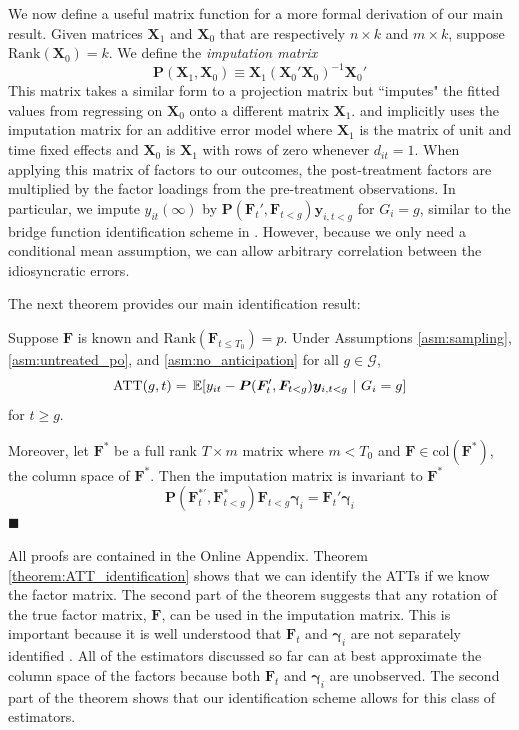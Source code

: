 We now define a useful matrix function for a more formal derivation of our main result. Given matrices $\bm X_1$ and $\bm X_0$ that are respectively $n \times k$ and $m \times k$, suppose $\text{Rank}( \bm X_0) = k$. We define the \textit{imputation matrix} 
\begin{equation}
  \bm P(\bm X_1, \bm X_0) \equiv \bm X_1 (\bm X_0' \bm X_0)^{-1} \bm X_0'
\end{equation}
This matrix takes a similar form to a projection matrix but ``imputes" the fitted values from regressing on $\bm X_0$ onto a different matrix $\bm X_1$. \citet{Gardner_2021} and \citet{Borusyak_Jaravel_Spiess_2021} implicitly uses the imputation matrix for an additive error model where $\bm X_1$ is the matrix of unit and time fixed effects and $\bm X_0$ is $\bm X_1$ with rows of zero whenever $d_{it} = 1$. When applying this matrix of factors to our outcomes, the post-treatment factors are multiplied by the factor loadings from the pre-treatment observations. In particular, we impute $y_{it}(\infty)$ by $\bm P(\bm{F}_{t}', \bm{F}_{t < g}) \bm y_{i,t < g}$ for $G_i = g$, similar to the bridge function identification scheme in \citet{Imbens_Kallus_Mao_2021}. However, because we only need a conditional mean assumption, we can allow arbitrary correlation between the idiosyncratic errors. 

The next theorem provides our main identification result:
\begin{theorem}\label{theorem:ATT_identification}
  Suppose $\bm{F}$ is known and $\text{Rank}(\bm{F}_{t \leq T_0}) = p$. Under Assumptions \ref{asm:sampling}, \ref{asm:untreated_po}, and \ref{asm:no_anticipation} for all $g \in \mathcal{G}$,
  \begin{equation}\label{eq:ATT_moments}
    \ATT(g,t) = \expec{y_{it} - \bm P(\bm{F}_{t}', \bm{F}_{t < g}) \bm y_{i,t < g}}{G_i = g}
  \end{equation}
  for $t \geq g$. 

  Moreover, let $\bm{F}^*$ be a full rank $T \times m$ matrix where $m < T_0$ and $\bm{F} \in \text{col}(\bm{F}^*)$, the column space of $\bm{F}^*$. Then the imputation matrix is invariant to $\bm{F}^*$
  \begin{equation}
    \bm P(\bm{F}_t^{*'}, \bm{F}^*_{t < g}) \bm{F}_{t < g} \bm \gamma_i = \bm{F}_t' \bm \gamma_i
  \end{equation}
  $\blacksquare$
\end{theorem}

All proofs are contained in the Online Appendix. Theorem \ref{theorem:ATT_identification} shows that we can identify the ATTs if we know the factor matrix. The second part of the theorem suggests that any rotation of the true factor matrix, $\bm{F}$, can be used in the imputation matrix. This is important because it is well understood that $\bm{F}_t$ and $\bm{\gamma}_i$ are not separately identified \citep{Ahn_Lee_Schmidt_2013,Xu_2017}. All of the estimators discussed so far can at best approximate the column space of the factors because both $\bm{F}_t$ and $\bm \gamma_i$ are unobserved. The second part of the theorem shows that our identification scheme allows for this class of estimators. 

